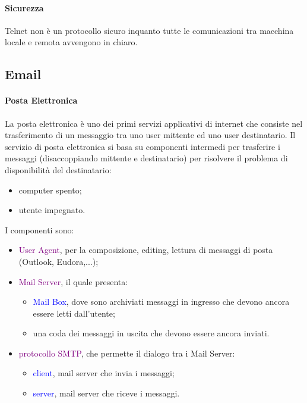 \paragraph{Sicurezza} Telnet non è un protocollo sicuro inquanto tutte le comunicazioni tra macchina locale e remota avvengono in chiaro.

\subsection{Email}
\paragraph*{Posta Elettronica} La posta elettronica è uno dei primi servizi applicativi di internet che consiste nel trasferimento di un messaggio tra uno user mittente ed uno user destinatario.
Il servizio di posta elettronica si basa su componenti intermedi per trasferire i messaggi (disaccoppiando mittente e destinatario) per risolvere il problema di disponibilità del destinatario:
\begin{itemize}
    \item computer spento;
    \item utente impegnato.
\end{itemize}
I componenti sono:
\begin{itemize}
    \item \textcolor{purple}{User Agent}, per la composizione, editing, lettura di messaggi di posta (Outlook, Eudora,...);
    \item \textcolor{purple}{Mail Server}, il quale presenta:
        \begin{itemize}
            \item \textcolor{blue}{Mail Box}, dove sono archiviati messaggi in ingresso che devono ancora essere letti dall'utente;
            \item una coda dei messaggi in uscita che devono essere ancora inviati.
        \end{itemize}
    \item \textcolor{purple}{protocollo SMTP}, che permette il dialogo tra i Mail Server:
        \begin{itemize}
            \item \textcolor{blue}{client}, mail server che invia i messaggi;
            \item \textcolor{blue}{server}, mail server che riceve i messaggi.
        \end{itemize}
\end{itemize}

